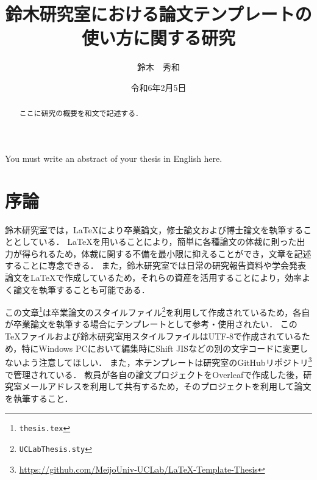 \documentclass[a4j,11pt]{ujreport}
\title{鈴木研究室における論文テンプレートの\\使い方に関する研究}
\author{鈴木　秀和}
\date{令和6年2月5日}
\begin{document}
\maketitle
\cleardoublepage

\begin{abstract}
ここに研究の概要を和文で記述する．
\end{abstract}
\begin{eabstract}
You must write an abstract of your thesis in English here.
\end{eabstract}
\cleardoublepage

\tableofcontents
\cleardoublepage




\chapter{序論}\label{chap:Intro}

鈴木研究室では，{\LaTeX}により卒業論文，修士論文および博士論文を執筆することとしている．
{\LaTeX}を用いることにより，簡単に各種論文の体裁に則った出力が得られるため，体裁に関する不備を最小限に抑えることができ，文章を記述することに専念できる．
また，鈴木研究室では日常の研究報告資料や学会発表論文を{\LaTeX}で作成しているため，それらの資産を活用することにより，効率よく論文を執筆することも可能である．

この文章\footnote{\texttt{thesis.tex}}は卒業論文のスタイルファイル\footnote{\texttt{UCLabThesis.sty}}を利用して作成されているため，各自が卒業論文を執筆する場合にテンプレートとして参考・使用されたい．
この{\TeX}ファイルおよび鈴木研究室用スタイルファイルはUTF-8で作成されているため，特にWindows PCにおいて編集時にShift JISなどの別の文字コードに変更しないよう注意してほしい．
また，本テンプレートは研究室のGitHubリポジトリ\footnote{\url{https://github.com/MeijoUniv-UCLab/LaTeX-Template-Thesis}}で管理されている．
教員が各自の論文プロジェクトをOverleafで作成した後，研究室メールアドレスを利用して共有するため，そのプロジェクトを利用して論文を執筆すること．
\end{document}
